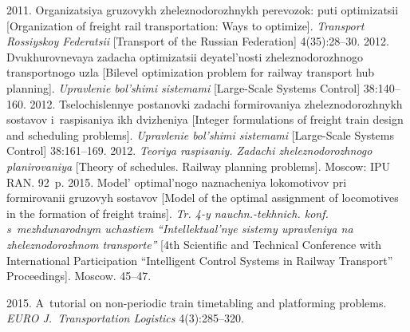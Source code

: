   \begin{multicols}{2}

\renewcommand{\bibname}{\protect\rmfamily References}

{\small\frenchspacing
 {%
 \begin{thebibliography}{99}

 2011. Organizatsiya gruzovykh 
zheleznodorozhnykh perevozok: puti optimizatsii 
[Organization of freight rail transportation: Ways to optimize].
\textit{Transport Rossiyskoy Federatsii} [Transport of the Russian Federation]
4(35):28--30.
2012. Dvukhurovnevaya zadacha optimizatsii deyatel'nosti 
zhe\-lez\-no\-do\-rozh\-no\-go transportnogo uzla [Bilevel optimization problem for 
railway transport hub planning]. \textit{Upravlenie bol'shimi sistemami}
[Large-Scale Systems Control] 38:140--160.
 2012. Tselochislennye postanovki 
zadachi formirovaniya zheleznodorozhnykh sostavov 
i~raspisaniya ikh dvizheniya [Integer formulations of
 freight train design and scheduling problems].
 \textit{Upravlenie bol'shimi sistemami} [Large-Scale Systems Control] 38:161--169.
2012. \textit{Teoriya raspisaniy. Zadachi zheleznodorozhnogo planirovaniya} 
[Theory of schedules. Railway planning problems]. Moscow: IPU RAN. 92~p.
2015. Model' optimal'nogo naznacheniya lokomotivov pri formirovanii
 gruzovyh sostavov
[Model of the optimal assignment of locomotives in the formation of freight
trains]. \textit{Tr. 4-y nauchn.-tekhnich. konf. s~mezhdunarodnym uchastiem 
``Intellektual'nye sistemy upravleniya na zheleznodorozhnom transporte''} 
[4th Scientific and Technical Conference with International Participation 
``Intelligent Control Systems in Railway Transport'' Proceedings]. Moscow. 45--47.

 2015. 
A~tutorial on non-periodic train timetabling and platforming problems. 
\textit{EURO J.~Transportation Logistics} 4(3):285--320.


\end{thebibliography}}}
\end{multicols}
